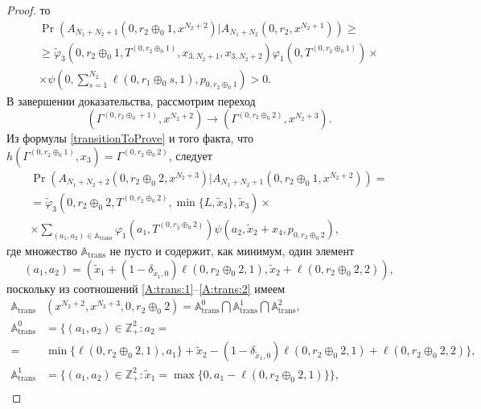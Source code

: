 \begin{proof}
то  
\begin{multline*}
\Pr( A_{N_1 + N_2 + 1} (0,  r_2 \oplus_0 1,  x^{N_2+2})
|A_{N_1 + N_2} (0,  r_2,  x^{N_2 + 1}) )
\geqslant \\
\geqslant \widetilde{\varphi}_3(0, r_2 \oplus_0 1,  T^{(0, r_2 \oplus_0 1)},  x_{3,  N_2 + 1}, x_{3,  N_2 + 2})
\varphi_1(0,  T^{(0,  r_2 \oplus_0 1)})\times\\
\times\psi(0,  \sum_{s=1}^{N_2} \ell(0, r_1 \oplus_0 s, 1),  p_{0,  r_2 \oplus_0 1})  > 0.
\end{multline*}
В завершении доказательства,  рассмотрим переход 
$$
(\Gamma^{(0,  r_2 \oplus_0 + 1)},  x^{N_2+2}) \rightarrow (\Gamma^{(0,  r_2 \oplus_0 2)},  x^{N_2+3}).
$$
Из формулы \eqref{transitionToProve} и того факта,  что $h(\Gamma^{(0,  r_2 \oplus_0 1)},  x_3) = \Gamma^{(0,  r_2 \oplus_0 2 )}$,  следует
\begin{multline*}
\Pr( A_{N_1 + N_2 + 2} (0,  r_2 \oplus_0 2,  x^{N_2+3})
|A_{N_1 + N_2 + 1} (0,  r_2\oplus_0 1,  x^{N_2 + 2}) )
=\\
=\widetilde{\varphi}_3(0,  r_2 \oplus_0 2,  T^{(0,  r_2 \oplus_0 2)},  \min\{L,  \tilde{x}_3\},  \tilde{x}_3) 
\times \\ \times
\sum_{(a_1,  a_2)\in {\mathbb A}_{\mathrm{trans}}}\varphi_1(a_1,  T^{(0,  r_2 \oplus_0 2)}) \psi(a_2,  \tilde{x}_2+x_4,  p_{0,  r_2 \oplus_0  2}), 
\end{multline*}
где множество ${\mathbb A}_{\mathrm{trans}}$ не пусто и содержит,  как минимум,  один элемент
$$
(a_1,  a_2)=(\tilde{x}_1 + (1 - \delta_{\tilde{x}_1, 0})\ell(0,  r_2 \oplus_0 2,  1), \tilde{x}_2 + \ell(0,  r_2 \oplus_0 2,  2)),$$  поскольку из соотношений \eqref{A:trans:1}--\eqref{A:trans:2} имеем
\begin{align*}
{\mathbb A}_{\mathrm{trans}}&(x^{N_2+2},  x^{N_2+3},  0,  r_2 \oplus_0 2) = {\mathbb A}_{\mathrm{trans}}^0 \bigcap {\mathbb A}_{\mathrm{trans}}^1\bigcap {\mathbb A}_{\mathrm{trans}}^2, \\
{\mathbb A}_{\mathrm{trans}}^0 &= \{(a_1,  a_2) \in \mathbb{Z}_+^2 \colon a_2 =\\
=&\min{\{\ell(0,  r_2 \oplus_0 2,  1),  a_1}\}   + \tilde{x}_2 - (1 - \delta_{\tilde{x}_1, 0})\ell(0, r_2 \oplus_0 2, 1) + \ell(0, r_2 \oplus_0 2, 2) \}, \\
{\mathbb A}_{\mathrm{trans}}^1 &= \{(a_1,  a_2) \in \mathbb{Z}_+^2 \colon \tilde{x}_1 = \max{\{0,  a_1-\ell(0,  r_2 \oplus_0 2,  1)\}}\}, \\

\end{align*}
\end{proof}
